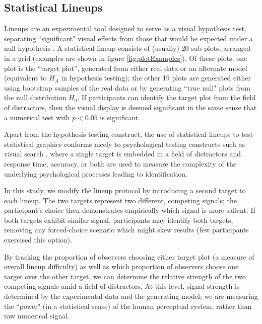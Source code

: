 \documentclass[11pt]{isuthesis}\usepackage[]{graphicx}\usepackage[]{color}
\begin{document}
\subsection*{Statistical Lineups}
Lineups are an experimental tool designed to serve as a visual hypothesis test, separating ``significant" visual effects from those that would be expected under a null hypothesis \citep{buja2009statistical, majumder2013validation,hofmann2012graphical, wickham2010graphical}. 
A statistical lineup consists of (usually) 20 sub-plots, arranged in a grid (examples are shown in figure \ref{fig:plotExamples}). 
Of these plots, one plot is the ``target plot'', generated from either real data or an alternate model (equivalent to $H_A$ in hypothesis testing); the other 19 plots are generated either using bootstrap samples of the real data or by generating ``true null" plots from the null distribution $H_0$. 
If participants can identify the target plot from the field of distractors, then the visual display is deemed significant in the same sense that a numerical test with $p<0.05$ is significant. 

Apart from the hypothesis testing construct, the use of statistical lineups to test statistical graphics conforms nicely to psychological testing constructs such as visual search \citep{demita1981validity,treisman1980feature}, where a single target is embedded in a field of distractors and response time, accuracy, or both are used to measure the complexity of the underlying psychological processes leading to identification. 

In this study, we modify the lineup protocol by introducing a second target to each lineup. The two targets represent two different, competing signals; the participant's choice then demonstrates empirically which signal is more salient. 
If both targets exhibit similar signal, participants may identify both targets, removing any forced-choice scenario which might skew results (few participants exercised this option). 

By tracking the proportion of observers choosing either target plot (a measure of overall lineup difficulty) as well as which proportion of observers choose one target over the other target, we can determine the relative strength of the two competing signals amid a field of distractors. At this level, signal strength is determined by the experimental data and the generating model; we are measuring the ``power" (in a statistical sense) of the human perceptual system, rather than raw numerical signal. 
\end{document}
